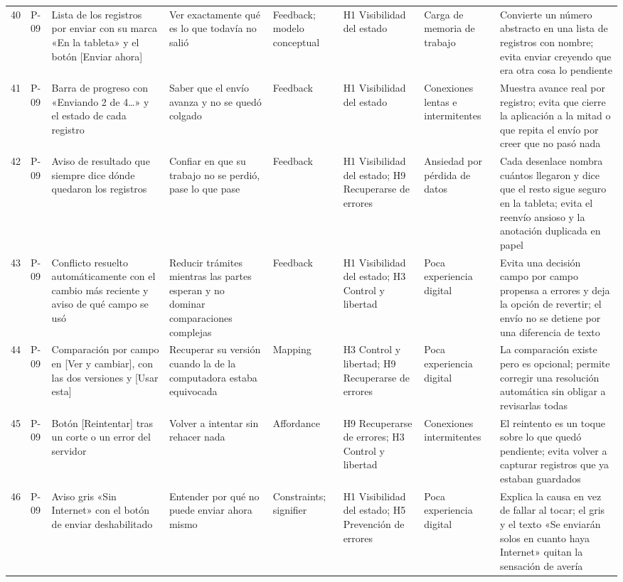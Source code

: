 \begin{longtable}{@{}p{0.6cm}p{1.5cm}p{3.6cm}p{3.4cm}p{2.2cm}p{2.8cm}p{2.3cm}p{4.6cm}@{}}
40 & P-09 & Lista de los registros por enviar con su marca «En la tableta» y el botón [Enviar ahora] & Ver exactamente qué es lo que todavía no salió & Feedback; modelo conceptual & H1 Visibilidad del estado & Carga de memoria de trabajo & Convierte un número abstracto en una lista de registros con nombre; evita enviar creyendo que era otra cosa lo pendiente \\
41 & P-09 & Barra de progreso con «Enviando 2 de 4…» y el estado de cada registro & Saber que el envío avanza y no se quedó colgado & Feedback & H1 Visibilidad del estado & Conexiones lentas e intermitentes & Muestra avance real por registro; evita que cierre la aplicación a la mitad o que repita el envío por creer que no pasó nada \\
42 & P-09 & Aviso de resultado que siempre dice dónde quedaron los registros & Confiar en que su trabajo no se perdió, pase lo que pase & Feedback & H1 Visibilidad del estado; H9 Recuperarse de errores & Ansiedad por pérdida de datos & Cada desenlace nombra cuántos llegaron y dice que el resto sigue seguro en la tableta; evita el reenvío ansioso y la anotación duplicada en papel \\
43 & P-09 & Conflicto resuelto automáticamente con el cambio más reciente y aviso de qué campo se usó & Reducir trámites mientras las partes esperan y no dominar comparaciones complejas & Feedback & H1 Visibilidad del estado; H3 Control y libertad & Poca experiencia digital & Evita una decisión campo por campo propensa a errores y deja la opción de revertir; el envío no se detiene por una diferencia de texto \\
44 & P-09 & Comparación por campo en [Ver y cambiar], con las dos versiones y [Usar esta] & Recuperar su versión cuando la de la computadora estaba equivocada & Mapping & H3 Control y libertad; H9 Recuperarse de errores & Poca experiencia digital & La comparación existe pero es opcional; permite corregir una resolución automática sin obligar a revisarlas todas \\
45 & P-09 & Botón [Reintentar] tras un corte o un error del servidor & Volver a intentar sin rehacer nada & Affordance & H9 Recuperarse de errores; H3 Control y libertad & Conexiones intermitentes & El reintento es un toque sobre lo que quedó pendiente; evita volver a capturar registros que ya estaban guardados \\
46 & P-09 & Aviso gris «Sin Internet» con el botón de enviar deshabilitado & Entender por qué no puede enviar ahora mismo & Constraints; signifier & H1 Visibilidad del estado; H5 Prevención de errores & Poca experiencia digital & Explica la causa en vez de fallar al tocar; el gris y el texto «Se enviarán solos en cuanto haya Internet» quitan la sensación de avería \\

\end{longtable}
